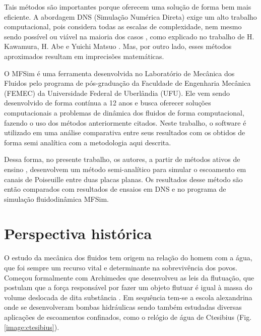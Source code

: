 Tais métodos são importantes porque oferecem uma solução de forma bem mais eficiente. A abordagem DNS (Simulação Numérica Direta) exige um alto trabalho computacional, pois considera todas as escalas de complexidade, nem mesmo sendo possível ou viável na maioria dos casos \cite{Kawamura}, como explicado no trabalho de H. Kawamura, H. Abe e Yuichi Matsuo \cite{Abe}. Mas, por outro lado, esses métodos aproximados resultam em imprecisões matemáticas.

O MFSim é uma ferramenta desenvolvida no Laboratório de Mecânica dos Fluidos pelo programa de pós-graduação da Faculdade de Engenharia Mecânica (FEMEC) da Universidade Federal de Uberlândia (UFU). Ele vem sendo desenvolvido de forma contínua a 12 anos e busca oferecer soluções computacionais a problemas de dinâmica dos fluidos de forma computacional, fazendo o uso dos métodos anteriormente citados. Neste trabalho, o software é utilizado em  uma análise comparativa entre seus resultados com os obtidos de forma semi analítica com a metodologia aqui descrita.

Dessa forma, no presente trabalho, os autores, a partir de métodos ativos de ensino \cite{CFD_in_learing}, desenvolvem um método semi-analítico para simular o escoamento em canais de Poiseuille \cite{Poiseuille} entre duas placas planas. Os resultados desse método são então comparados com resultados de ensaios em DNS e no programa de simulação fluidodinâmica MFSim.

\section{Perspectiva histórica}

O estudo da mecânica dos fluidos tem origem na relação do homem com a água, que foi sempre um recurso vital e determinante na sobrevivência dos povos. Começou formalmente com Archimedes que desenvolveu as leis da flutuação, que postulam que a força responsável por fazer um objeto flutuar é igual à massa do volume deslocada de dita substância \cite{dijksterhuis2014archimedes}. Em sequência tem-se a escola alexandrina onde se desenvolveram bombas hidráulicas sendo também estudadas diversas aplicações de escoamentos confinados, como o relógio de água de Ctesibius (Fig. \ref{image:ctesibius}).

